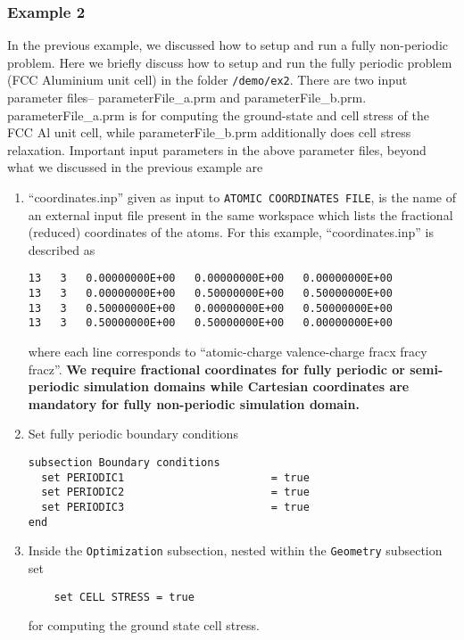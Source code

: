 \subsubsection{Example 2}\label{sec:example2}
In the previous example, we discussed how to setup and run a fully non-periodic problem.
Here we briefly discuss how to setup and run the fully periodic problem (FCC Aluminium unit cell) in the folder
\verb|/demo/ex2|. There are two input parameter files-- parameterFile\_a.prm and parameterFile\_b.prm. parameterFile\_a.prm is
for computing the ground-state and cell stress of the FCC Al unit cell, while parameterFile\_b.prm additionally does cell stress relaxation.  
Important input parameters in the above parameter files, beyond what we discussed in the previous example are
\begin{enumerate}
\item ``coordinates.inp'' given as input to \verb|ATOMIC COORDINATES FILE|, is the name of an external input file present in the same workspace which lists the fractional (reduced) coordinates of the atoms. For this example, ``coordinates.inp'' is described as 
\begin{verbatim}
13   3   0.00000000E+00   0.00000000E+00   0.00000000E+00
13   3   0.00000000E+00   0.50000000E+00   0.50000000E+00
13   3   0.50000000E+00   0.00000000E+00   0.50000000E+00
13   3   0.50000000E+00   0.50000000E+00   0.00000000E+00
\end{verbatim}
where each line corresponds to ``atomic-charge valence-charge fracx fracy fracz''. {\bf We require fractional coordinates for fully periodic or semi-periodic simulation domains while Cartesian coordinates are mandatory for fully non-periodic simulation domain.}
\item Set fully periodic boundary conditions
\begin{verbatim}	
subsection Boundary conditions
  set PERIODIC1                       = true
  set PERIODIC2                       = true
  set PERIODIC3                       = true
end
\end{verbatim}

\item Inside the \verb|Optimization| subsection, nested within the \verb|Geometry| subsection set 
\begin{verbatim}	
    set CELL STRESS = true
\end{verbatim}	
for computing the ground state cell stress. 


\end{enumerate}
